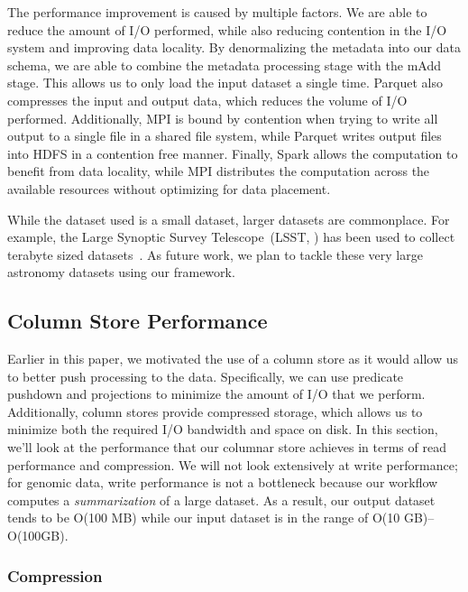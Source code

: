 \documentclass{acm_proc_article-sp}
\begin{document}
The performance improvement is caused by multiple factors. We are able to reduce the amount of I/O performed,
while also reducing contention in the I/O system and improving data locality. By denormalizing the metadata into
our data schema, we are able to combine the metadata processing stage with the mAdd stage. This allows us
to only load the input dataset a single time. Parquet also compresses the input and output data, which reduces
the volume of I/O performed. Additionally, MPI is bound by contention when trying to write all output to a single
file in a shared file system, while Parquet writes output files into HDFS in a contention free manner. Finally, Spark
allows the computation to benefit from data locality, while MPI distributes the computation across the available
resources without optimizing for data placement.

While the dataset used is a small dataset, larger datasets are commonplace. For example, the Large Synoptic
Survey Telescope~(LSST, \cite{lsst2008}) has been used to collect terabyte sized datasets~\cite{moyers13}. As
future work, we plan to tackle these very large astronomy datasets using our framework.

\subsection{Column Store Performance}
\label{sec:column-store-perf}

Earlier in this paper, we motivated the use of a column store as it would allow us to better push processing to
the data. Specifically, we can use predicate pushdown and projections to minimize the amount of I/O that we
perform. Additionally, column stores provide compressed storage, which allows us to minimize both the required
I/O bandwidth and space on disk. In this section, we'll look at the performance that our columnar store achieves
in terms of read performance and compression. We will not look extensively at write performance; for genomic
data, write performance is not a bottleneck because our workflow computes a \emph{summarization} of a large
dataset. As a result, our output dataset tends to be O(100 MB) while our input dataset is in the range of
O(10 GB)--O(100GB).

\subsubsection{Compression}
\label{sec:compression}
\end{document}
